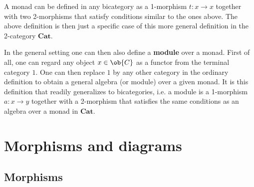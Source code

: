     \begin{remark}
        A monad can be defined in any bicategory as a 1-morphism $t:x\rightarrow x$ together with two 2-morphisms that satisfy conditions similar to the ones above. The above definition is then just a specific case of this more general definition in the 2-category $\mathbf{Cat}$.

        In the general setting one can then also define a \textbf{module} over a monad. First of all, one can regard any object $x\in\ob{C}$ as a functor from the terminal category $1$. One can then replace $1$ by any other category in the ordinary definition to obtain a general algebra (or module) over a given monad. It is this definition that readily generalizes to bicategories, i.e. a module is a 1-morphism $a:x\rightarrow y$ together with a 2-morphism that satisfies the same conditions as an algebra over a monad in $\mathbf{Cat}$.
    \end{remark}

\section{Morphisms and diagrams}\label{cat:section:morphisms}
\subsection{Morphisms}



